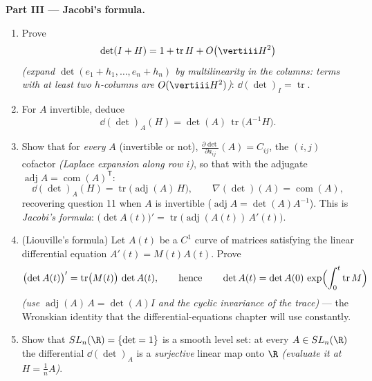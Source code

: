 \begin{problem}
\medskip
\noindent\textbf{Part III --- Jacobi's formula.}
\begin{enumerate}[resume]
  \item Prove
        \[
        \det(I + H) = 1 + \operatorname{tr}H +
        O\bigl(\vertiii H^2\bigr)
        \]
        \emph{(expand $\det(e_1 + h_1, \dots, e_n + h_n)$ by
        multilinearity in the columns: terms with at least two
        $h$-columns are $O(\vertiii H^2)$)}: $\dd(\det)_I =
        \operatorname{tr}$.
  \item For $A$ invertible, deduce
        \[
        \dd(\det)_A(H) = \det(A)\,
        \operatorname{tr}\bigl(A^{-1}H\bigr) .
        \]
  \item Show that for \emph{every} $A$ (invertible or not),
        $\frac{\partial\det}{\partial a_{ij}}(A) = C_{ij}$, the
        $(i,j)$ cofactor \emph{(Laplace expansion along row
        $i$)}, so that with the adjugate $\operatorname{adj}A =
        \operatorname{com}(A)^{\mathsf T}$:
        \[
        \dd(\det)_A(H) =
        \operatorname{tr}\bigl(\operatorname{adj}(A)\,H\bigr),
        \qquad
        \nabla(\det)(A) = \operatorname{com}(A) ,
        \]
        recovering question 11 when $A$ is invertible
        ($\operatorname{adj}A = \det(A)A^{-1}$). This is
        \emph{Jacobi's formula}: $\bigl(\det
        A(t)\bigr)' = \operatorname{tr}\bigl(
        \operatorname{adj}(A(t))\,A'(t)\bigr)$.
  \item (Liouville's formula) Let $A(t)$ be a $C^1$ curve of
        matrices satisfying the linear differential equation
        $A'(t) = M(t)A(t)$. Prove
        \[
        \bigl(\det A(t)\bigr)' =
        \operatorname{tr}\bigl(M(t)\bigr)\,\det A(t),
        \qquad\text{hence}\qquad
        \det A(t) = \det A(0)\,
        \exp\Bigl(\int_0^t\operatorname{tr}M\Bigr)
        \]
        \emph{(use $\operatorname{adj}(A)\,A = \det(A)I$ and
        the cyclic invariance of the trace)} --- the Wronskian
        identity that the differential-equations chapter will
        use constantly.
  \item Show that $SL_n(\R) = \{\det = 1\}$ is a smooth level
        set: at every $A \in SL_n(\R)$ the differential
        $\dd(\det)_A$ is a \emph{surjective} linear map onto
        $\R$ \emph{(evaluate it at $H = \frac1nA$)}.
\end{enumerate}


\end{problem}
